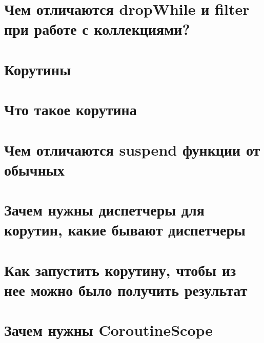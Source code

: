 \documentclass[12pt]{article}
\begin{document}
\section*{Чем отличаются dropWhile и filter при работе с коллекциями?}
\begin{enumerate}[leftmargin=*]
\end{enumerate}
\vspace{2mm}
\section*{Корутины}
\begin{enumerate}[leftmargin=*]
\end{enumerate}
\vspace{2mm}
\section*{Что такое корутина}
\begin{enumerate}[leftmargin=*]
\end{enumerate}
\vspace{2mm}
\section*{Чем отличаются suspend функции от обычных}
\begin{enumerate}[leftmargin=*]
\end{enumerate}
\vspace{2mm}
\section*{Зачем нужны диспетчеры для корутин, какие бывают диспетчеры}
\begin{enumerate}[leftmargin=*]
\end{enumerate}
\vspace{2mm}
\section*{Как запустить корутину, чтобы из нее можно было получить результат}
\begin{enumerate}[leftmargin=*]
\end{enumerate}
\vspace{2mm}
\section*{Зачем нужны CoroutineScope}
\begin{enumerate}[leftmargin=*]
\end{enumerate}
\vspace{2mm}
\end{document}

